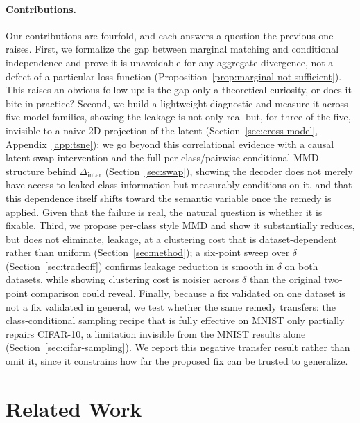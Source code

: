 \documentclass[10pt,letterpaper]{article}
\begin{document}
\paragraph{Contributions.}
Our contributions are fourfold, and each answers a question the previous
one raises. First, we formalize the gap between marginal matching and
conditional independence and prove it is unavoidable for any aggregate
divergence, not a defect of a particular loss function
(Proposition~\ref{prop:marginal-not-sufficient}). This raises an obvious
follow-up: is the gap only a theoretical curiosity, or does it bite in
practice? Second, we build a lightweight diagnostic and measure it across
five model families, showing the leakage is not only real but, for three of
the five, invisible to a naive 2D projection of the latent
(Section~\ref{sec:cross-model}, Appendix~\ref{app:tsne}); we go beyond this
correlational evidence with a causal latent-swap intervention and the full
per-class/pairwise conditional-MMD structure behind $\Delta_{\mathrm{inter}}$
(Section~\ref{sec:swap}), showing the decoder does not merely have access
to leaked class information but measurably conditions on it, and that this
dependence itself shifts toward the semantic variable once the remedy is
applied. Given that the failure is real, the natural question is whether it
is fixable. Third, we propose per-class style MMD and show it substantially
reduces, but does not eliminate, leakage, at a clustering cost that is
dataset-dependent rather than uniform (Section~\ref{sec:method}); a
six-point sweep over $\delta$ (Section~\ref{sec:tradeoff}) confirms leakage
reduction is smooth in $\delta$ on both datasets, while showing clustering
cost is noisier across $\delta$ than the original two-point comparison
could reveal. Finally, because a fix validated
on one dataset is not a fix validated in general, we test whether the same
remedy transfers: the class-conditional sampling recipe that is fully
effective on MNIST only partially repairs CIFAR-10, a limitation invisible
from the MNIST results alone (Section~\ref{sec:cifar-sampling}). We report
this negative transfer result rather than omit it, since it constrains how
far the proposed fix can be trusted to generalize.

\section{Related Work}
\end{document}
